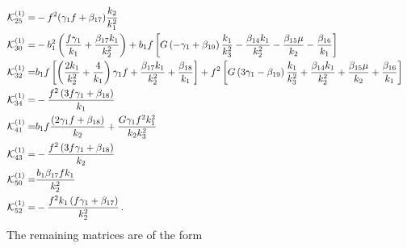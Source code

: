 \begin{align}
 \\ \mathcal{K}^{(1)}_{25}=& -f^2(\gamma_1f+\beta_{17})\frac{k_{2} }{k_{1}^{2}}
 \\ \mathcal{K}^{(1)}_{30}=& - b_{1}^{2}\left(\frac{f \gamma_{1}}{k_{1}}+\frac{\beta_{17} k_{1} }{k_{2}^{2}}\right)+b_{1}f\left[G\left(- \gamma_{1}+\beta_{19}\right)  \frac{k_{1} }{k_{3}^{2}}-\frac{\beta_{14} k_{1}}{k_{2}^{2}}-\frac{\beta_{15} \mu}{k_{2}}-\frac{\beta_{16}}{k_{1}}\right] 
 \\ \mathcal{K}^{(1)}_{32}=& b_{1}f\left[\left(\frac{2 k_{1}}{k_{2}^{2}}+\frac{4}{k_{1}}\right) \gamma_{1} f+\frac{ \beta_{17} k_{1}}{k_{2}^{2}}+\frac{\beta_{18}}{k_{1}}\right] +f^2\left[G\left(3 \gamma_{1}- \beta_{19}\right) \frac{k_{1} }{k_{3}^{2}}+\frac{\beta_{14} k_{1}}{k_{2}^{2}}+\frac{\beta_{15} \mu}{k_{2}}+\frac{\beta_{16}}{k_{1}}\right]
 \\ \mathcal{K}^{(1)}_{34}=& -\frac{f^{2}\left(3 f \gamma_{1}+\beta_{18}\right)}{k_{1}}
 \\ \mathcal{K}^{(1)}_{41}=& b_{1}f\frac{\left(2 \gamma_{1} f+ \beta_{18}\right)}{k_{2}} +\frac{G \gamma_{1} f^{2} k_{1}^{2} }{k_{2} k_{3}^{2}}
 \\ \mathcal{K}^{(1)}_{43}=&-\frac{f^{2}\left(3 f \gamma_{1}+\beta_{18}\right)}{k_{2}}
 \\ \mathcal{K}^{(1)}_{50}=& \frac{b_1 \beta_{17} f k_1}{k_2^2}
 \\ \mathcal{K}^{(1)}_{52}=&-\frac{f^{2} k_{1}\left(f \gamma_{1}+\beta_{17}\right)}{k_{2}^{2}}\,.
\end{align}
The remaining matrices are of the form 
